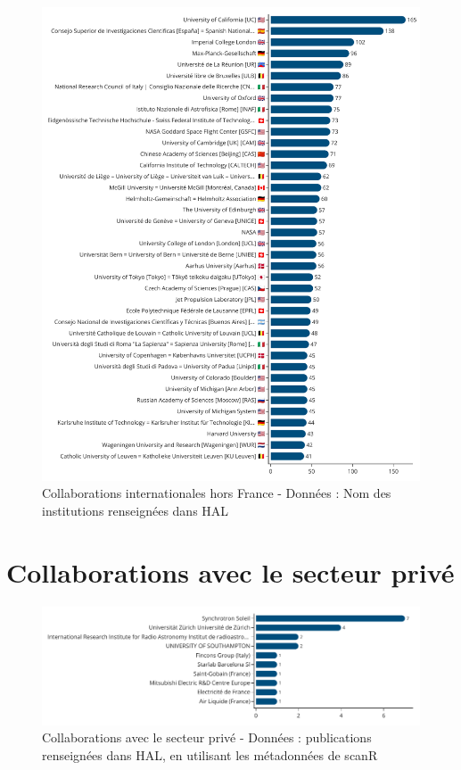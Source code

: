 \documentclass[french, 11pt]{dibiso/biso}
\begin{document}
\begin{figure}[!h]
  \includegraphics[width=\textwidth]{figures/collaboration_names.pdf}
  \caption{Collaborations internationales hors France - Données : Nom des institutions renseignées dans HAL}
  \label{fig_collab_names}
\end{figure}

{\footnotesize\collaborationnamesinfo}

\pagebreak

\section[Version bêta]{Collaborations avec le secteur privé}

\begin{figure}[!h]
  \includegraphics[width=\textwidth]{figures/private_sector_collaborations.pdf}
  \centering
  \caption{Collaborations avec le secteur privé - Données : publications renseignées dans HAL, en utilisant les métadonnées de scanR}
  \label{fig_private_collab}
\end{figure}
\end{document}
